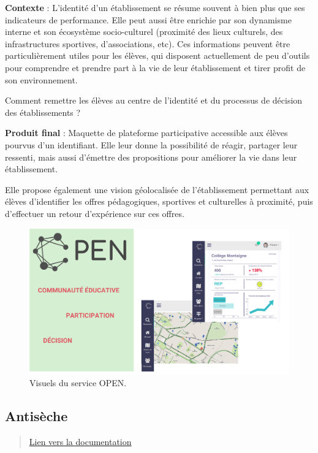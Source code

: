 \documentclass[]{book}
\begin{document}
\textbf{Contexte} : L'identité d'un établissement se résume souvent à
bien plus que ses indicateurs de performance. Elle peut aussi être
enrichie par son dynamisme interne et son écosystème socio-culturel
(proximité des lieux culturels, des infrastructures sportives,
d'associations, etc). Ces informations peuvent être particulièrement
utiles pour les élèves, qui disposent actuellement de peu d'outils pour
comprendre et prendre part à la vie de leur établissement et tirer
profit de son environnement.

Comment remettre les élèves au centre de l'identité et du processus de
décision des établissements ?

\textbf{Produit final} : Maquette de plateforme participative accessible
aux élèves pourvus d'un identifiant. Elle leur donne la possibilité de
réagir, partager leur ressenti, mais aussi d'émettre des propositions
pour améliorer la vie dans leur établissement.

Elle propose également une vision géolocalisée de l'établissement
permettant aux élèves d'identifier les offres pédagogiques, sportives et
culturelles à proximité, puis d'effectuer un retour d'expérience sur ces
offres.

\begin{figure}

{\centering \includegraphics[width=0.7\linewidth]{./img/open} 

}

\caption{Visuels du service OPEN.}\label{fig:unnamed-chunk-9}
\end{figure}

\subsection{Antisèche}\label{antiseche}

\begin{quote}
\href{http://datavizchallenge.fr/t/dataviz-r-shinyapp/74}{Lien vers la
documentation}
\end{quote}
\end{document}
